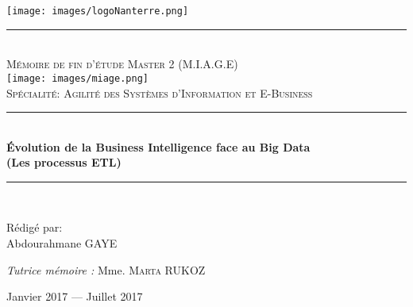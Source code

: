 \documentclass[12pt,a4wide,twoside]{report}
\newcommand{\HRule}{\rule{\linewidth}{0.5mm}}
\begin{document}
\begin{titlepage}
  \begin{sffamily}
  \begin{center}

    
    
		\begin{center}
				\texttt{[image: images/logoNanterre.png]}
		\end{center}
		    \HRule \\[2cm]
		
		


    \textsc{\Large Mémoire de fin d'étude Master 2 (M.I.A.G.E)}\\[1.5cm]
        \texttt{[image: images/miage.png]}    \\[1cm]
    
    		\textsc{\LARGE Spécialité: Agilité des Systèmes d'Information et E-Business} \\[1cm]

    \HRule \\[0.4cm]
    { \LARGE \bfseries Évolution de la Business Intelligence face au Big Data\\ (Les processus ETL)\\[0.4cm] }

    \HRule \\[2cm]


    \begin{minipage}{0.4\textwidth}
      \begin{flushleft} \large
        Rédigé par:\\
        Abdourahmane GAYE\\
      \end{flushleft}
    \end{minipage}
    \begin{minipage}{0.4\textwidth}
      \begin{flushright} \large
        \emph{Tutrice mémoire :} Mme. \textsc{Marta RUKOZ}
      \end{flushright}
    \end{minipage}

    \vfill

    {\large Janvier 2017 —  Juillet 2017}

  \end{center}
  \end{sffamily}
\end{titlepage}

\tableofcontents
\listoffigures
{}
\end{document}
